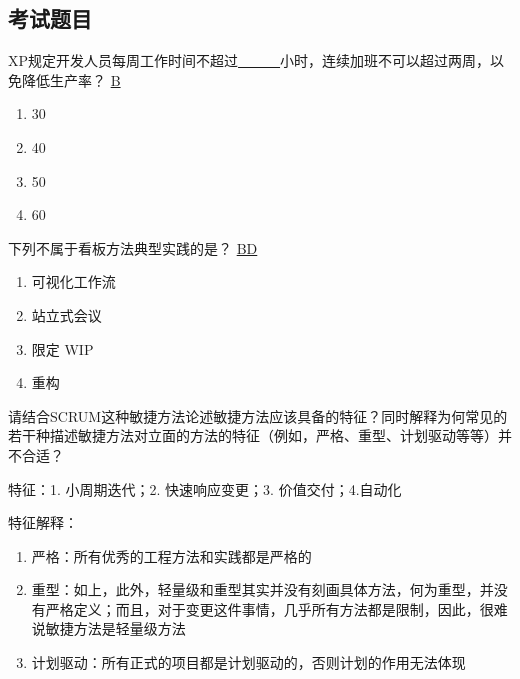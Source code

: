 \subsection{考试题目}
\begin{problem}
	XP规定开发人员每周工作时间不超过\uline{\ \ \ \ \ \ }小时，连续加班不可以超过两周，以免降低生产率？
	\uline{B}    
    \vspace{-0.8em}
    \begin{multicols}{4}
        \begin{enumerate}[label=\Alph*.]
            \item 30
            \item 40
            \item 50
            \item 60
        \end{enumerate}
    \end{multicols}
    \vspace{-1em}
\end{problem}

\begin{problem}
	下列不属于看板方法典型实践的是？
	\uline{BD}    
    \vspace{-0.8em}
    \begin{multicols}{4}
        \begin{enumerate}[label=\Alph*.]
            \item 可视化工作流
            \item 站立式会议
            \item 限定 WIP
            \item 重构
        \end{enumerate}
    \end{multicols}
    \vspace{-1em}
\end{problem}

\begin{problem}
请结合SCRUM这种敏捷方法论述敏捷方法应该具备的特征？同时解释为何常见的若干种描述敏捷方法对立面的方法的特征（例如，严格、重型、计划驱动等等）并不合适？

特征：1. 小周期迭代；2. 快速响应变更；3. 价值交付；4.自动化

特征解释：
\begin{enumerate}[label=\arabic*.]
    \item 严格：所有优秀的工程方法和实践都是严格的
    \item 重型：如上，此外，轻量级和重型其实并没有刻画具体方法，何为重型，并没有严格定义；而且，对于变更这件事情，几乎所有方法都是限制，因此，很难说敏捷方法是轻量级方法
    \item 计划驱动：所有正式的项目都是计划驱动的，否则计划的作用无法体现
\end{enumerate}
\end{problem}


